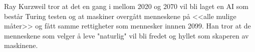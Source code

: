 Ray Kurzweil tror at det en gang i mellom 2020 og 2070 vil bli laget en AI som består Turing testen og at maskiner overgått menneskene på <<alle mulige måter>> og fått samme rettigheter som mennesker innnen 2099. Han tror at de menneskene som velger å leve "naturlig" vil bli fredet og hyllet som skaperen av maskinene.
